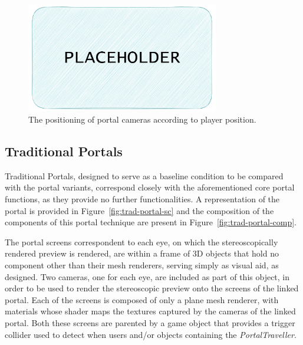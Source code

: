 \begin{figure}[t]
    \centering
     \includegraphics[width=0.75\textwidth]{NOVAthesisFiles/Images/placeholder.pdf}
     \caption[The positioning of portal cameras according to player position.]
     {The positioning of portal cameras according to player position.}
     \label{fig:cam-placement}
\end{figure}

\subsection{Traditional Portals}
\label{sec:trad-portals}

Traditional Portals, designed to serve as a baseline condition to be compared with the portal variants, correspond closely with 
the aforementioned core portal functions, as they provide no further functionalities. A representation of the portal is provided in 
Figure~\ref{fig:trad-portal-sc} and the composition of the components of this 
portal technique are present in Figure~\ref{fig:trad-portal-comp}.

The portal screens correspondent to each eye, on which the stereoscopically rendered preview is rendered, are within a frame of 3D objects 
that hold no component other than their mesh renderers, serving simply as visual aid, as designed. 
Two cameras, one for each eye, are included as part of this object, in order to be used to render the stereoscopic preview onto the screens of
the linked portal.
Each of the screens is composed of only a plane mesh renderer, with materials whose shader maps the textures captured by the cameras of the 
linked portal. 
Both these screens are parented by a game object that provides a trigger collider used to detect when users and/or objects containing the 
\textit{PortalTraveller}. 

